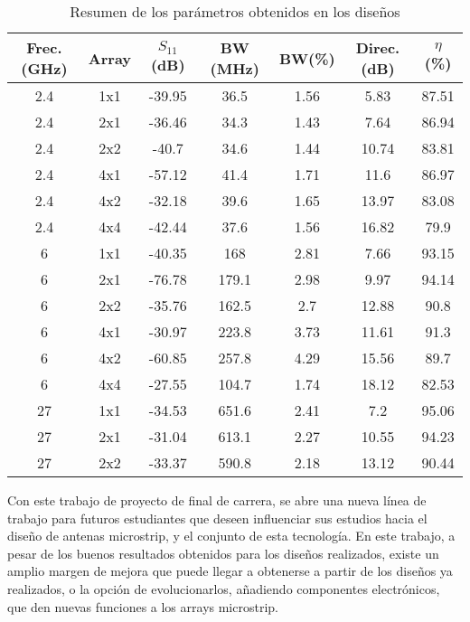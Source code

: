 \begin{table}
\centering
\small
\begin{tabular}{c c c c c c c}
\toprule[\heavyrulewidth]\toprule[\heavyrulewidth]
\hline

\textbf{Frec. (GHz)} &\textbf{ Array} & \textbf{$S_{11}$ (dB)}  & \textbf{BW (MHz)} &\textbf{ BW(\%)} & \textbf{Direc. (dB)} & \textbf{$\eta$ (\%)} \\
\midrule
2.4 & 1x1 & -39.95 & 36.5 & 1.56 & 5.83 & 87.51 \\ 
2.4 & 2x1 & -36.46 & 34.3 & 1.43 & 7.64 & 86.94 \\ 
2.4 & 2x2 & -40.7 & 34.6 & 1.44 & 10.74 & 83.81 \\ 
2.4 & 4x1 & -57.12 & 41.4 & 1.71 & 11.6 & 86.97 \\ 
2.4 & 4x2 & -32.18 & 39.6 & 1.65 & 13.97 & 83.08 \\ 
2.4 & 4x4 & -42.44 & 37.6 & 1.56 & 16.82 & 79.9 \\ 
6 & 1x1 & -40.35 & 168 & 2.81 & 7.66 & 93.15 \\ 
6 & 2x1 & -76.78 & 179.1 & 2.98 & 9.97 & 94.14 \\ 
6 & 2x2 & -35.76 & 162.5 & 2.7 & 12.88 & 90.8 \\ 
6 & 4x1 & -30.97 & 223.8 & 3.73 & 11.61 & 91.3 \\ 
6 & 4x2 & -60.85 & 257.8 & 4.29 & 15.56 & 89.7 \\ 
6 & 4x4 & -27.55 & 104.7 & 1.74 & 18.12 & 82.53 \\ 
27 & 1x1 & -34.53 & 651.6 & 2.41 & 7.2 & 95.06 \\ 
27 & 2x1 & -31.04 & 613.1 & 2.27 & 10.55 & 94.23 \\ 
27 & 2x2 & -33.37 & 590.8 & 2.18 & 13.12 & 90.44 \\ 
   \bottomrule[\heavyrulewidth]

\end{tabular}

   \caption{Resumen de los parámetros obtenidos en los diseños}
   \label{tab:final}
\end{table}
\par Con este trabajo de proyecto de final de carrera, se abre una nueva línea de trabajo para futuros estudiantes que deseen influenciar sus estudios hacia el diseño de antenas microstrip, y el conjunto de esta tecnología. En este trabajo, a pesar de los buenos resultados obtenidos para los diseños realizados, existe un amplio margen de mejora que puede llegar a obtenerse a partir de los diseños ya realizados, o la opción de evolucionarlos, añadiendo componentes electrónicos, que den nuevas funciones a los arrays microstrip.
